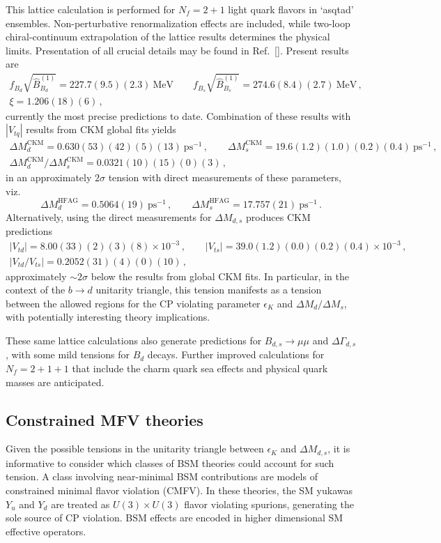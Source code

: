 This lattice calculation is performed for $N_f = 2+1$ light quark flavors in `asqtad' ensembles. Non-perturbative renormalization effects are included, while two-loop chiral-continuum extrapolation of the lattice results determines the physical limits. Presentation of all crucial details may be found in Ref.~[]. Present results are
\begin{gather}
	f_{B_d}\sqrt{\hat{B}^{(1)}_{B_d}} = 227.7(9.5)(2.3)~\text{MeV} \qquad f_{B_s}\sqrt{\hat{B}^{(1)}_{B_s}} = 274.6(8.4)(2.7)~\text{MeV}\,,\nonumber\\
		\xi = 1.206(18)(6)\,,
\end{gather}
currently the most precise predictions to date. Combination of these results with $|V_{tq}|$ results from CKM global fits yields 
\begin{gather}
	\Delta M^{\text{CKM}}_d = 0.630(53)(42)(5)(13)~\text{ps}^{-1}\,, \qquad \Delta M^{\text{CKM}}_s = 19.6(1.2)(1.0)(0.2)(0.4)~\text{ps}^{-1}\,,\nonumber \\
	\Delta M^{\text{CKM}}_d/\Delta M^{\text{CKM}}_s = 0.0321(10)(15)(0)(3)\,,
\end{gather}
in an approximately $2\sigma$ tension with direct measurements of these parameters, viz.
\begin{equation}
	\Delta M^{\text{HFAG}}_d = 0.5064(19)~\text{ps}^{-1}\,,\qquad \Delta M^{\text{HFAG}}_s = 17.757(21)~\text{ps}^{-1}\,.
\end{equation}
Alternatively, using the direct measurements for $\Delta M_{d,s}$ produces CKM predictions
\begin{gather}
	|V_{td}| = 8.00(33)(2)(3)(8)\times 10^{-3}\,,\qquad |V_{ts}| = 39.0(1.2)(0.0)(0.2)(0.4)\times 10^{-3}\,,\nonumber\\
	|V_{td}/V_{ts}| = 0.2052(31)(4)(0)(10)\,,
\end{gather}
approximately $\sim2\sigma$ below the results from global CKM fits. In particular, in the context of the $b \to d$ unitarity triangle, this tension manifests as a tension between the allowed regions for the CP violating parameter $\epsilon_K$ and $\Delta M_{d}/\Delta M_s$, with potentially interesting theory implications. 

These same lattice calculations also generate predictions for $B_{d,s} \to \mu\mu$ and $\Delta\Gamma_{d,s}$, with some mild tensions for $B_d$ decays. Further improved calculations for $N_f = 2 + 1 + 1$ that include the charm quark sea effects and physical quark masses are anticipated.

\subsection{Constrained MFV theories}
Given the possible tensions in the unitarity triangle between $\epsilon_K$ and $\Delta M_{d,s}$, it is informative to consider which classes of BSM theories could account for such tension. A class involving near-minimal BSM contributions are models of constrained minimal flavor violation (CMFV). In these theories, the SM yukawas $Y_u$ and $Y_d$ are treated as $U(3)\times U(3)$ flavor violating spurions, generating the sole source of CP violation.  BSM effects are encoded in higher dimensional SM effective operators.

